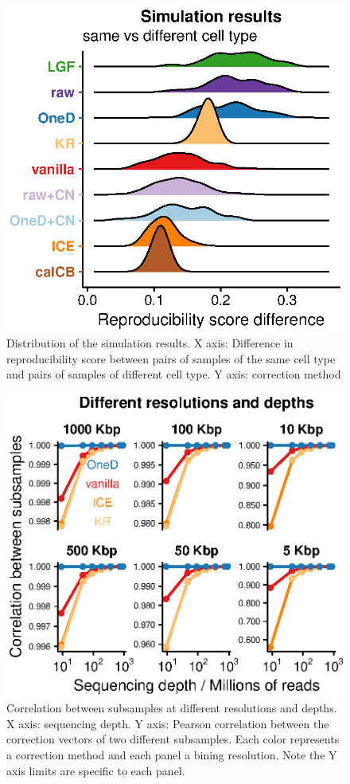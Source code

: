 \documentclass[12pt]{report}
\begin{document}
\begin{figure}
	\centerline{\includegraphics[width=\textwidth]{nar_figures/supp_figure_12.eps}}
    \caption{
    Distribution of the simulation results. X axis: Difference in
    reproducibility score between pairs of samples of the same cell type and
    pairs of samples of different cell type. Y axis: correction method}
\end{figure}

\begin{figure}
	\centerline{\includegraphics[width=\textwidth]{nar_figures/supp_figure_13.eps}}
    \caption{Correlation between subsamples at different resolutions and
    depths. X axis: sequencing depth. Y axis: Pearson correlation between the
    correction vectors of two different subsamples. Each color represents a
    correction method and each panel a bining resolution. Note the Y axis limits
    are specific to each panel.}
\end{figure}
\end{document}
